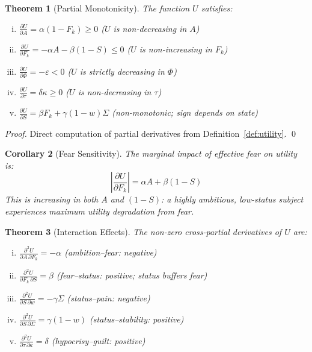 \documentclass[12pt,a4paper]{article}
\theoremstyle{plain}
\newtheorem{theorem}{Theorem}[section]
\newtheorem{corollary}[theorem]{Corollary}
\theoremstyle{definition}
\theoremstyle{remark}
\newcommand{\Fk}{F_k}
\begin{document}
\begin{theorem}[Partial Monotonicity]\label{thm:monotone}
The function $U$ satisfies:
\begin{enumerate}[(i),nosep]
  \item $\frac{\partial U}{\partial A} = \alpha(1-\Fk) \geq 0$ \quad ($U$ is non-decreasing in $A$)
  \item $\frac{\partial U}{\partial \Fk} = -\alpha A - \beta(1-S) \leq 0$ \quad ($U$ is non-increasing in $\Fk$)
  \item $\frac{\partial U}{\partial \Phi} = -\varepsilon < 0$ \quad ($U$ is strictly decreasing in $\Phi$)
  \item $\frac{\partial U}{\partial \tau} = \delta\kappa \geq 0$ \quad ($U$ is non-decreasing in $\tau$)
  \item $\frac{\partial U}{\partial S} = \beta \Fk + \gamma(1-w)\Sigma$ \quad (non-monotonic; sign depends on state)
\end{enumerate}
\end{theorem}

\begin{proof}
Direct computation of partial derivatives from Definition~\ref{def:utility}. \qed
\end{proof}

\begin{corollary}[Fear Sensitivity]
The marginal impact of effective fear on utility is:
\[
\left|\frac{\partial U}{\partial \Fk}\right| = \alpha A + \beta(1-S)
\]
This is increasing in both $A$ and $(1-S)$: a highly ambitious, low-status subject experiences maximum utility degradation from fear.
\end{corollary}

\begin{theorem}[Interaction Effects]\label{thm:hessian}
The non-zero cross-partial derivatives of $U$ are:
\begin{enumerate}[(i),nosep]
  \item $\frac{\partial^2 U}{\partial A\,\partial \Fk} = -\alpha$ \quad (ambition--fear: negative)
  \item $\frac{\partial^2 U}{\partial \Fk\,\partial S} = \beta$ \quad (fear--status: positive; status buffers fear)
  \item $\frac{\partial^2 U}{\partial S\,\partial w} = -\gamma\Sigma$ \quad (status--pain: negative)
  \item $\frac{\partial^2 U}{\partial S\,\partial \Sigma} = \gamma(1-w)$ \quad (status--stability: positive)
  \item $\frac{\partial^2 U}{\partial \tau\,\partial \kappa} = \delta$ \quad (hypocrisy--guilt: positive)
\end{enumerate}
\end{theorem}
\end{document}
